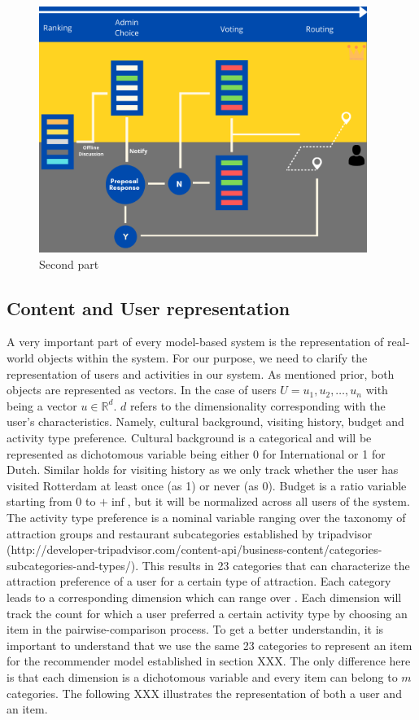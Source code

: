 \documentclass[11pt,a4paper,oneside]{article}
\begin{document}
\begin{figure}[H]
    \centering
    \includegraphics[width=0.95\textwidth]{paper/imgs/flowchart/2.png}
    \caption{Second part}
    \label{fig:flowchart2}
\end{figure}

\subsection{Content and User representation}
A very important part of every model-based system is the representation of real-world objects within the system. For our purpose, we need to clarify the representation of users and activities in our system. As mentioned prior, both objects are represented as vectors. In the case of users $U = {u_1, u_2, \ldots, u_n} $ with being a vector $u \in \mathbb{R}^d$. $d$ refers to the dimensionality corresponding with the user's characteristics. Namely, cultural background, visiting history, budget and activity type preference. Cultural background is a categorical and will be represented as dichotomous variable being either 0 for International or 1 for Dutch. Similar holds for visiting history as we only track whether the user has visited Rotterdam at least once (as 1) or never (as 0). Budget is a ratio variable starting from 0 to $+\inf$, but it will be normalized across all users of the system. The activity type preference is a nominal variable ranging over the taxonomy of attraction groups and restaurant subcategories established by tripadvisor (http://developer-tripadvisor.com/content-api/business-content/categories-subcategories-and-types/). This results in 23 categories that can characterize the attraction preference of a user for a certain type of attraction. Each category leads to a corresponding dimension which can range over . Each dimension will track the count for which a user preferred a certain activity type by choosing an item in the pairwise-comparison process. 
To get a better understandin, it is important to understand that we use the same 23 categories to represent an item for the recommender model established in section XXX. The only difference here is that each dimension is a dichotomous variable and every item can belong to $m$ categories. The following XXX illustrates the representation of both a user and an item.
\end{document}
